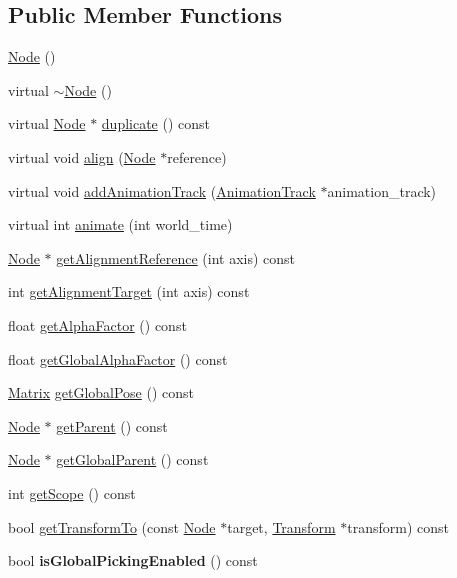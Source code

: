 \subsection*{Public Member Functions}
\begin{CompactItemize}
\item 
\hyperlink{classm3g_1_1Node_0d313fac56abd7ebe58a17f1530b879e}{Node} ()
\item 
virtual \hyperlink{classm3g_1_1Node_6fa6bf60f34f1e3efb0e59333428c9c8}{$\sim$Node} ()
\item 
virtual \hyperlink{classm3g_1_1Node}{Node} $\ast$ \hyperlink{classm3g_1_1Node_0b9f7531a4b56d34f47aeb1fff0d37e0}{duplicate} () const 
\item 
virtual void \hyperlink{classm3g_1_1Node_3db1b4be060fe3d4f3dbf9720ef85234}{align} (\hyperlink{classm3g_1_1Node}{Node} $\ast$reference)
\item 
virtual void \hyperlink{classm3g_1_1Node_415c0b110f95410ded9b85e5d99a496b}{addAnimationTrack} (\hyperlink{classm3g_1_1AnimationTrack}{AnimationTrack} $\ast$animation\_\-track)
\item 
virtual int \hyperlink{classm3g_1_1Node_8aad1ceab4c2a03609c8a42324ce484d}{animate} (int world\_\-time)
\item 
\hyperlink{classm3g_1_1Node}{Node} $\ast$ \hyperlink{classm3g_1_1Node_ca338390bd2dee287fe6f5cbc4e094e1}{getAlignmentReference} (int axis) const 
\item 
int \hyperlink{classm3g_1_1Node_e5bbf42b3d88193fda0b476e1b1da009}{getAlignmentTarget} (int axis) const 
\item 
float \hyperlink{classm3g_1_1Node_bf7e8f9d9f530274aaf27e69910f8689}{getAlphaFactor} () const 
\item 
float \hyperlink{classm3g_1_1Node_f48a25661cb8a6f3559f7d5ffbc520b3}{getGlobalAlphaFactor} () const 
\item 
\hyperlink{classm3g_1_1Matrix}{Matrix} \hyperlink{classm3g_1_1Node_b50dd3f0331a71cf820bbd1edc894ef0}{getGlobalPose} () const 
\item 
\hyperlink{classm3g_1_1Node}{Node} $\ast$ \hyperlink{classm3g_1_1Node_ce26c2757f265bc6038e6818d2eb6ad9}{getParent} () const 
\item 
\hyperlink{classm3g_1_1Node}{Node} $\ast$ \hyperlink{classm3g_1_1Node_895a7a11e91762ed5aa2b849449d503a}{getGlobalParent} () const 
\item 
int \hyperlink{classm3g_1_1Node_a3c291c19cf805338fa4ad3c3deb663a}{getScope} () const 
\item 
bool \hyperlink{classm3g_1_1Node_0dd162e8412d8589b27ee03d798189a6}{getTransformTo} (const \hyperlink{classm3g_1_1Node}{Node} $\ast$target, \hyperlink{classm3g_1_1Transform}{Transform} $\ast$transform) const 
\item 
\hypertarget{classm3g_1_1Node_20e38e50d93c9c01db4151475e2ffad2}{
bool \textbf{isGlobalPickingEnabled} () const }
\label{classm3g_1_1Node_20e38e50d93c9c01db4151475e2ffad2}


\end{CompactItemize}
